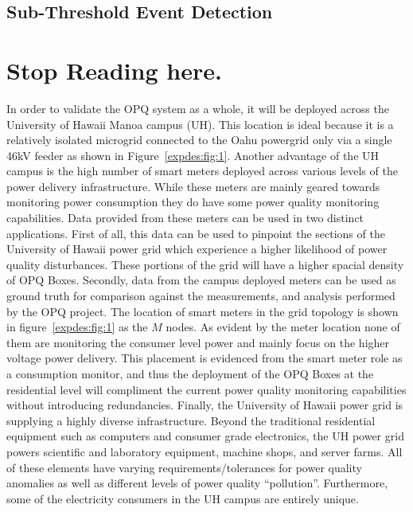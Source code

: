 \subsection{Sub-Threshold Event Detection}

\clearpage

\clearpage

\section{Stop Reading here.}\label{sec:stop-reading.}
In order to validate the OPQ system as a whole, it will be deployed across the University of Hawaii Manoa campus (UH).
This location is ideal because it is a relatively isolated microgrid connected to the Oahu powergrid only via a single 46kV feeder as shown in Figure~\ref{expdes:fig:1}.
Another advantage of the UH campus is the high number of smart meters deployed across various levels of the power delivery infrastructure.
While these meters are mainly geared towards monitoring power consumption they do have some power quality monitoring capabilities.
Data provided from these meters can be used in two distinct applications.
First of all, this data can be used to pinpoint the sections of the University of Hawaii power grid which experience a higher likelihood of power quality disturbances.
These portions of the grid will have a higher spacial density of OPQ Boxes.
Secondly, data from the campus deployed meters can be used as ground truth for comparison against the measurements, and analysis performed by the OPQ project.
The location of smart meters in the grid topology is shown in figure~\ref{expdes:fig:1} as the $M$ nodes.
As evident by the meter location none of them are monitoring the consumer level power and mainly focus on the higher voltage power delivery.
This placement is evidenced from the smart meter role as a consumption monitor, and thus the deployment of the OPQ Boxes at the residential level will compliment the current power quality monitoring capabilities without introducing redundancies.
Finally, the University of Hawaii power grid is supplying a highly diverse infrastructure.
Beyond the traditional residential equipment such as computers and consumer grade electronics, the UH power grid powers scientific and laboratory equipment, machine shops, and server farms.
All of these elements have varying requirements/tolerances for power quality anomalies as well as different levels of power quality ``pollution''.
Furthermore, some of the electricity consumers in the UH campus are entirely unique.
